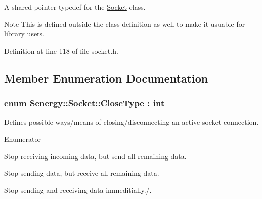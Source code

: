 A shared pointer typedef for the \hyperlink{class_senergy_1_1_socket}{Socket} class. 

\begin{DoxyNote}{Note}
This is defined outside the class definition as well to make it usuable for library users. 
\end{DoxyNote}


Definition at line 118 of file socket.\-h.



\subsection{Member Enumeration Documentation}
\hypertarget{class_senergy_1_1_socket_a88ed1eb1a5c47ea1b395715aabd37ab4}{
\subsubsection[{Close\-Type}]{\setlength{\rightskip}{0pt plus 5cm}enum {\bf Senergy\-::\-Socket\-::\-Close\-Type} \-: int\hspace{0.3cm}{\ttfamily [strong]}}}\label{class_senergy_1_1_socket_a88ed1eb1a5c47ea1b395715aabd37ab4}


Defines possible ways/means of closing/disconnecting an active socket connection. 

\begin{Desc}
\item[Enumerator]\par
\begin{description}
\item[{\em 
\hypertarget{class_senergy_1_1_socket_a88ed1eb1a5c47ea1b395715aabd37ab4a1851aea8452370ffbc6364027d018da9}{Stop\-Receiving}\label{class_senergy_1_1_socket_a88ed1eb1a5c47ea1b395715aabd37ab4a1851aea8452370ffbc6364027d018da9}
}]Stop receiving incoming data, but send all remaining data. \item[{\em 
\hypertarget{class_senergy_1_1_socket_a88ed1eb1a5c47ea1b395715aabd37ab4a948c383a847087d69042e091d164380b}{Stop\-Sending}\label{class_senergy_1_1_socket_a88ed1eb1a5c47ea1b395715aabd37ab4a948c383a847087d69042e091d164380b}
}]Stop sending data, but receive all remaining data. \item[{\em 
\hypertarget{class_senergy_1_1_socket_a88ed1eb1a5c47ea1b395715aabd37ab4a40b522922220c34afd8e1d4a3ba02208}{Stop\-All}\label{class_senergy_1_1_socket_a88ed1eb1a5c47ea1b395715aabd37ab4a40b522922220c34afd8e1d4a3ba02208}
}]Stop sending and receiving data immeditially./. \end{description}
\end{Desc}


